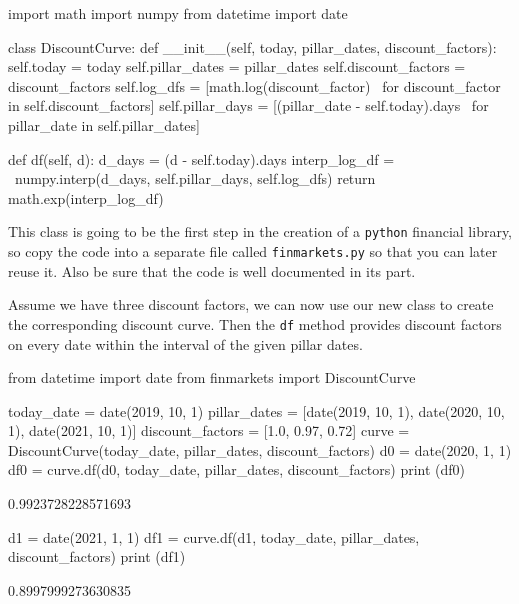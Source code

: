 \begin{ipython}
import math
import numpy
from datetime import date

class DiscountCurve:
    def __init__(self, today, pillar_dates, discount_factors):
        self.today = today
        self.pillar_dates = pillar_dates
        self.discount_factors = discount_factors
        self.log_dfs = [math.log(discount_factor) \
            for discount_factor in self.discount_factors]
        self.pillar_days = [(pillar_date - self.today).days \
            for pillar_date in self.pillar_dates]

    def df(self, d):
        d_days = (d - self.today).days
        interp_log_df = \
            numpy.interp(d_days, self.pillar_days, self.log_dfs)
        return math.exp(interp_log_df)
\end{ipython}

\begin{finmarkets}
This class is going to be the first step in the creation of a \texttt{python} financial library, so copy the code into a separate file called \texttt{finmarkets.py} so that you can later reuse it. Also be sure that the code is well documented in its part.	
\end{finmarkets}

Assume we have three discount factors, we can now use our new class to create the corresponding discount curve. Then the \texttt{df} method provides discount factors on every date within the interval of the given pillar dates.

\begin{ipython}
from datetime import date
from finmarkets import DiscountCurve

today_date = date(2019, 10, 1)
pillar_dates = [date(2019, 10, 1), date(2020, 10, 1), date(2021, 10, 1)]
discount_factors = [1.0, 0.97, 0.72]
curve = DiscountCurve(today_date, pillar_dates, discount_factors)
d0 = date(2020, 1, 1)
df0 = curve.df(d0, today_date, pillar_dates, discount_factors)
print (df0)
\end{ipython}
\begin{ioutput}
0.9923728228571693
\end{ioutput}
\begin{ipython}
d1 = date(2021, 1, 1)
df1 = curve.df(d1, today_date, pillar_dates, discount_factors)
print (df1)
\end{ipython}
\begin{ioutput}
0.8997999273630835
\end{ioutput}

